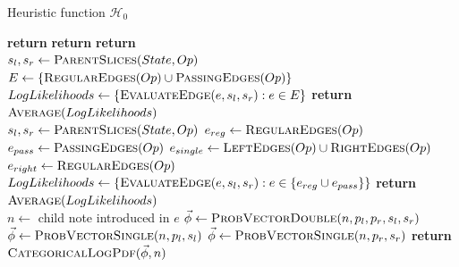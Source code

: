 \documentclass[12pt,a4paper,twoside,openright]{report}
\theoremstyle{definition}
\begin{document}
\begin{algorithm}[h]
  \caption{Heuristic function $\mathcal{H}_0$}
    \label{code:heuristic0}

    \begin{algorithmic}[1]
        \State \textbf{return} 
        \State \textbf{return} 
        \State \textbf{return}  
      \EndIf
      \EndFunction \\

      \State $s_l, s_r \gets \Call{ParentSlices}{State, Op}$
      \State $E \gets \{\Call{RegularEdges}{Op} \cup \Call{PassingEdges}{Op}\}$
      \State $LogLikelihoods \gets \{ \Call{EvaluateEdge}{e, s_l, s_r} : e \in E\}$
      \State \textbf{return} 
        $\Call{Average}{LogLikelihoods}$ 
      \EndFunction \\

       
      \State $s_l, s_r \gets \Call{ParentSlices}{State, Op}$
      \State $e_{reg} \gets \Call{RegularEdges}{Op}$
      \State $e_{pass} \gets \Call{PassingEdges}{Op}$
      \State $e_{single} \gets \Call{LeftEdges}{Op} \cup \Call{RightEdges}{Op}$
      \State $e_{right} \gets \Call{RegularEdges}{Op}$
      \State $LogLikelihoods \gets \{ \Call{EvaluateEdge}{e, s_l, s_r} : e \in \{e_{reg} \cup e_{pass}\}\}$
      \State \textbf{return} 
        $\Call{Average}{LogLikelihoods}$ 
      \EndFunction \\

      \State $n \gets $ child note introduced in $e$ 
      \State $\vec{\phi} \gets \Call{ProbVectorDouble}{n,p_l,p_r,s_l,s_r}$ 
      \State $\vec{\phi} \gets \Call{ProbVectorSingle}{n,p_l,s_l}$ 
      \State $\vec{\phi} \gets \Call{ProbVectorSingle}{n,p_r,s_r}$ 
      \EndIf
      \State \textbf{return} $\Call{CategoricalLogPdf}{\vec{\phi}, n}$
      \EndFunction \\
    \end{algorithmic}
  \end{algorithm}
\end{document}
